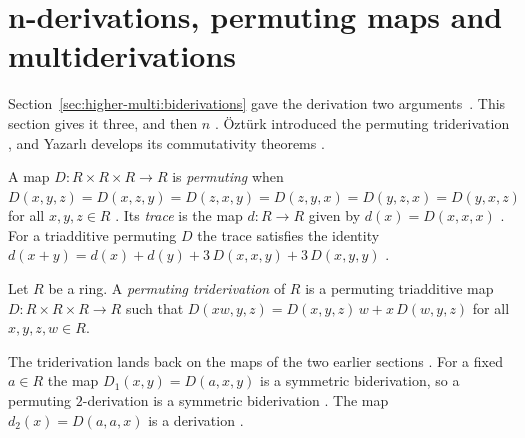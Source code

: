 \section{n-derivations, permuting maps and multiderivations}\label{sec:higher-multi:n-derivations}

Section~\ref{sec:higher-multi:biderivations} gave the derivation two
arguments~\cite[p.~489]{Yazarli2017Trideriv}. This section gives it three, and then $n$
\cite[p.~490]{Yazarli2017Trideriv}. Öztürk introduced the permuting
triderivation \cite[reference~10]{Ozturk1999Trideriv}, and Yazarlı develops
its commutativity theorems \cite[p.~489]{Yazarli2017Trideriv}.

A map $D\colon R\times R\times R\to R$ is \emph{permuting} when
$D(x,y,z)=D(x,z,y)=D(z,x,y)=D(z,y,x)=D(y,z,x)=D(y,x,z)$ for all $x,y,z\in R$
\cite[p.~490]{Yazarli2017Trideriv}. Its \emph{trace} is the map $d\colon
R\to R$ given by $d(x)=D(x,x,x)$ \cite[p.~490]{Yazarli2017Trideriv}. For a
triadditive permuting $D$ the trace satisfies the identity $d(x+y) =
d(x)+d(y)+3\,D(x,x,y)+3\,D(x,y,y)$ \cite[p.~490]{Yazarli2017Trideriv}.

\begin{definition}\label{def:higher:trideriv}
Let $R$ be a ring. A \emph{permuting triderivation} of $R$ is a permuting
triadditive map $D\colon R\times R\times R\to R$ such that
$D(xw,y,z)=D(x,y,z)\,w+x\,D(w,y,z)$ for all $x,y,z,w\in R$.
\end{definition}

The triderivation lands back on the maps of the two earlier sections
\cite[p.~490]{Yazarli2017Trideriv}. For a fixed $a\in R$ the map
$D_1(x,y)=D(a,x,y)$ is a symmetric biderivation, so a permuting
$2$-derivation is a symmetric biderivation
\cite[p.~490]{Yazarli2017Trideriv}. The map $d_2(x)=D(a,a,x)$ is a
derivation \cite[p.~490]{Yazarli2017Trideriv}.

